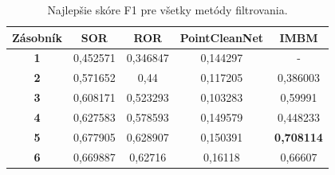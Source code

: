 \begin{table}[H]
	\caption{\label{tab:final_comp} Najlepšie skóre F1 pre všetky metódy filtrovania. }
	\centering
	\begin{tabular}{ccccc}
		\toprule
		\textbf{Zásobník} & \textbf{SOR} & \textbf{ROR} & \textbf{PointCleanNet} & \textbf{IMBM}     \\ 
		\midrule
		\textbf{1}           & 0,452571     & 0,346847     & 0,144297               & -                 \\ 
		\textbf{2}           & 0,571652     & 0,44         & 0,117205               & 0,386003          \\ 
		\textbf{3}           & 0,608171     & 0,523293     & 0,103283               & 0,59991           \\ 
		\textbf{4}           & 0,627583     & 0,578593     & 0,149579               & 0,448233          \\ 
		\textbf{5}           & 0,677905     & 0,628907     & 0,150391               & \textbf{0,708114} \\ 
		\textbf{6}           & 0,669887     & 0,62716      & 0,16118                & 0,66607           \\ 
		\bottomrule
	\end{tabular}
\end{table}

